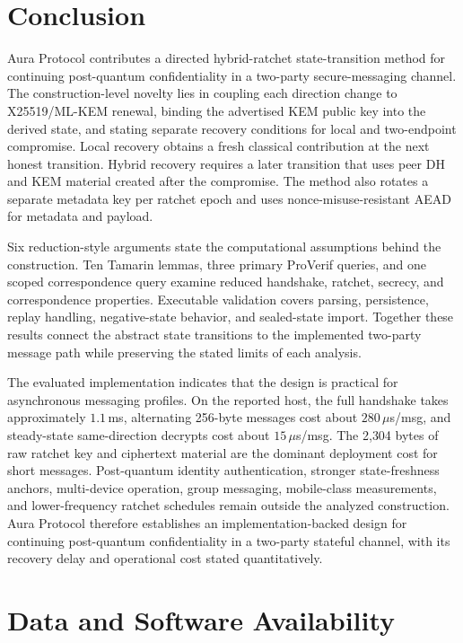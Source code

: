 \documentclass[preprint,12pt]{elsarticle}
\theoremstyle{definition}
\begin{document}
\section{Conclusion}\label{sec:conclusion}

Aura Protocol contributes a directed hybrid-ratchet state-transition method for
continuing post-quantum confidentiality in a two-party secure-messaging channel.
The construction-level novelty lies in coupling each direction change to
X25519/ML-KEM renewal, binding the advertised KEM public key into the derived
state, and stating separate recovery conditions for local and two-endpoint
compromise. Local recovery obtains a fresh classical contribution at the next
honest transition. Hybrid recovery requires a later transition that uses peer
DH and KEM material created after the compromise. The method also rotates a
separate metadata key per ratchet epoch and uses nonce-misuse-resistant AEAD for
metadata and payload.

Six reduction-style arguments state the computational assumptions behind the
construction. Ten Tamarin lemmas, three primary ProVerif queries, and one scoped
correspondence query examine reduced handshake, ratchet, secrecy, and
correspondence properties. Executable
validation covers parsing, persistence, replay handling, negative-state
behavior, and sealed-state import. Together these results connect the abstract
state transitions to the implemented two-party message path while preserving
the stated limits of each analysis.

The evaluated implementation indicates that the design is practical for
asynchronous messaging profiles. On the reported host, the full handshake takes
approximately $1.1$\,ms, alternating 256-byte messages cost about
$280\,\mu$s/msg, and steady-state same-direction decrypts cost about
$15\,\mu$s/msg. The 2{,}304 bytes of raw ratchet key and ciphertext material are the dominant deployment
cost for short messages. Post-quantum identity authentication, stronger
state-freshness anchors, multi-device operation, group messaging, mobile-class
measurements, and lower-frequency ratchet schedules remain outside the analyzed
construction. Aura Protocol therefore establishes an implementation-backed
design for continuing post-quantum confidentiality in a two-party stateful
channel, with its recovery delay and operational cost stated quantitatively.

\section*{Data and Software Availability}
\end{document}
